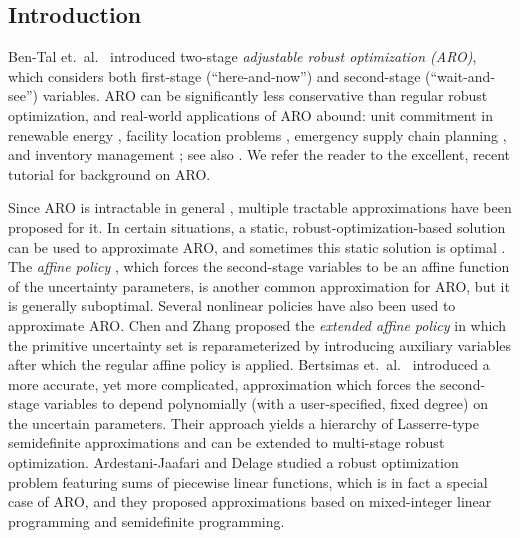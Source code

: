 \documentclass[12pt]{article}
\begin{document}
\begin{onehalfspace}

\section{Introduction} %

Ben-Tal et.~al.~\cite{Ben-Tal.Goryashko.Guslitzer.Nemirovski.2004}
introduced two-stage {\em adjustable robust optimization
(ARO)\/}, which considers both first-stage (``here-and-now'')
and second-stage (``wait-and-see'') variables. ARO can be
significantly less conservative than regular robust optimization,
and real-world applications of ARO abound: unit commitment in
renewable energy \cite{Bertsimas.Litvinov.Sun.Zhao.Zheng.2013,
Wang.Watson.Guan.2013, Zhao.Zeng.2012}, facility location problems
\cite{Ardestani-Jaafari.Delage.2014, Atamturk.Zhang.2007,
Gabrel.Lacroix.Murat.Remli.2014}, emergency supply chain planning
\cite{Ben-Tal.Chung.Mandala.Yao.2011}, and inventory management
\cite{Ben-Tal.Boaz.Shimrit.2009, Solyali.Cordeau.Laporte.2016}; see
also \cite{Ben-Tal.Golany.Nemirovski.Vial.2005, Fonseca.Rustem.2012,
Poss.Raack.2013}. We refer the reader to the excellent, recent tutorial
\cite{Delage.Iancu.2015} for background on ARO.

Since ARO is intractable in general
\cite{Ben-Tal.Goryashko.Guslitzer.Nemirovski.2004}, multiple
tractable approximations have been proposed for it. In certain
situations, a static, robust-optimization-based solution can be used
to approximate ARO, and sometimes this static solution is optimal
\cite{Ben-Tal.Nemirovski.1999,Bertsimas.Goyal.Lu.2014}. The {\em
affine policy\/} \cite{Ben-Tal.Goryashko.Guslitzer.Nemirovski.2004},
which forces the second-stage variables to be an affine function of
the uncertainty parameters, is another common approximation for ARO,
but it is generally suboptimal. Several nonlinear policies have also
been used to approximate ARO. Chen and Zhang \cite{Chen.Zhang.2009}
proposed the {\em extended affine policy\/} in which the primitive
uncertainty set is reparameterized by introducing auxiliary variables
after which the regular affine policy is applied. Bertsimas
et.~al.~\cite{Bertsimas.Iancu.Parrilo.2011} introduced a more accurate,
yet more complicated, approximation which forces the second-stage
variables to depend polynomially (with a user-specified, fixed degree)
on the uncertain parameters. Their approach yields a hierarchy
of Lasserre-type semidefinite approximations and can be extended
to multi-stage robust optimization. Ardestani-Jaafari and Delage
\cite{Ardestani-Jaafari.Delage.2016a} studied a robust optimization
problem featuring sums of piecewise linear functions, which is in
fact a special case of ARO, and they proposed approximations based on
mixed-integer linear programming and semidefinite programming.



\end{onehalfspace}
\end{document}
